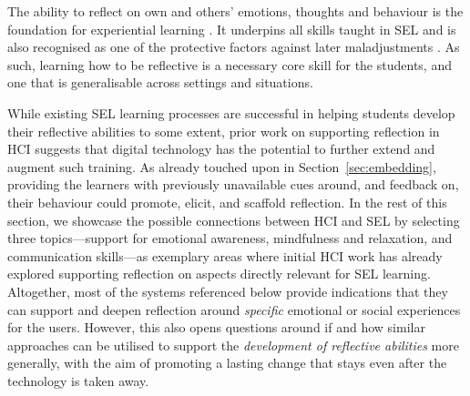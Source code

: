 \documentclass[prodmode,acmtochi]{acmsmall}
\begin{document}
The ability to reflect on own and others' emotions, thoughts and behaviour is the foundation for experiential learning \cite{Moon1999}. It underpins all skills taught in SEL \cite{Cohen2001,Cohen2006,Pasi2001,Maree2007,CASEL2013} and is also recognised as one of the protective factors against later maladjustments \cite{Zins2004}. %
As such, learning how to be reflective is a necessary core skill for the students, and one that is generalisable across settings and situations. 

While existing SEL learning processes are successful in helping students develop their reflective abilities to some extent, prior work on supporting reflection in HCI suggests that digital technology has the potential to further extend and augment such training. As already touched upon in Section~\ref{sec:embedding}, providing the learners with previously unavailable cues around, and feedback on, their behaviour could promote, elicit, and scaffold reflection. In the rest of this section, we showcase the possible connections between HCI and SEL by selecting three topics---support for emotional awareness, mindfulness and relaxation, and communication skills---as exemplary areas where initial HCI work has already explored supporting reflection on aspects directly relevant for SEL learning. Altogether, most of the systems referenced below provide indications that they can support and deepen reflection around \emph{specific} emotional or social experiences for the users. However, this also opens questions around if and how similar approaches can be utilised to support the \emph{development of reflective abilities} more generally, with the aim of promoting a lasting change that stays even after the technology is taken away.
\end{document}
